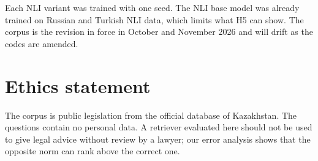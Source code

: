\documentclass[11pt]{article}
\begin{document}
Each NLI variant was trained with one seed. The NLI base model was already trained on Russian and Turkish NLI
data, which limits what H5 can show. The corpus is the revision in force in October and November 2026 and will
drift as the codes are amended.

\section*{Ethics statement}

The corpus is public legislation from the official database of Kazakhstan. The questions contain no personal
data. A retriever evaluated here should not be used to give legal advice without review by a lawyer; our error
analysis shows that the opposite norm can rank above the correct one.


\end{document}

